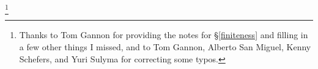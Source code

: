 \author{Arun Debray}
\date{\today}
\email{\MyEmail}
\thanks{Thanks to Tom Gannon for providing the notes for \S\ref{finiteness} and filling in a few other things I
missed, and to Tom Gannon, Alberto San Miguel, Kenny Schefers, and Yuri Sulyma for correcting some typos.}


\usepackage{afterpage}
\usepackage{tikz}
\usetikzlibrary{hobby}
\usepackage{lmodern}
\usepackage[T1]{fontenc}
\theoremstyle{theorem}
\newtheorem{conj}[equation]{Conjecture}
\theoremstyle{definition}
\newtheorem{quotdefn}[equation]{``Definition''}


\newcommand{\sX}{\mathscr X}
\newcommand{\sK}{\mathscr K}
\newcommand{\sN}{\mathscr N}
\newcommand{\sA}{\mathscr A}
\newcommand{\sB}{\mathscr B}
\newcommand{\scC}{\mathscr C}
\newcommand{\sC}{\mathsf C}
\newcommand{\M}{\mathcal M}
\DeclareMathOperator{\mult}{mult}
\newcommand{\PSU}{\mathrm{PSU}}
\DeclareMathOperator{\stab}{stab}
\DeclareMathOperator{\mon}{mon}
\DeclareMathOperator{\Div}{Div}
\DeclareMathOperator{\PDiv}{PDiv}
\DeclareMathOperator{\Cl}{C\ell}
\DeclareMathOperator{\Pic}{Pic}
\DeclareMathOperator{\Jac}{Jac}
\newcommand{\AJ}{\mathrm{AJ}}
\DeclareMathOperator{\ev}{ev}
\newcommand{\MCG}{\mathrm{MCG}}
\newcommand{\pr}{\mathrm{pr}}
\newcommand{\HP}{\mathbb{HP}}
\newcommand{\FRM}{\mathit{fr}}
\newcommand{\PT}{\mathit{PT}}
\newcommand{\cH}{\mathcal H}
\newcommand{\cE}{\mathcal E}
\DeclareMathOperator{\Conf}{Conf}
\newcommand{\cC}{\mathcal C}
\newcommand{\cI}{\mathcal I}
\newcommand{\cS}{\mathcal S}
\newcommand{\cD}{\mathcal D}
\newcommand{\gr}{\mathrm{gr}}
\newcommand{\SEnd}{\mathrm{SEnd}}
\DeclareMathOperator{\cl}{cl}
\DeclareMathOperator{\Ad}{Ad}
\DeclareMathOperator{\Der}{Der}
\newcommand{\spin}{\mathfrak{spin}}
\newcommand{\fs}{\mathfrak s}
\newcommand{\tnabla}{\widetilde\nabla}
\newcommand{\cB}{\mathcal B}
\newcommand{\cF}{\mathcal F}
\newcommand{\ch}{\mathit{ch}}
\newcommand{\scal}{\mathrm{scal}}
\newcommand{\vol}{\mathrm{vol}}
\newcommand{\fc}{\mathfrak c}
\newcommand{\Cirr}{C^{\mathrm{irr}}}
\newcommand{\Cred}{C^{\mathrm{red}}}
\newcommand{\cW}{\mathcal W}
\newcommand{\Mirr}{\widetilde M_\eta^{\mathrm{irr}}}
\DeclareMathOperator{\Det}{Det}
\newcommand{\sw}{\mathit{sw}}
\newcommand{\cV}{\mathcal V}
\DeclareMathOperator{\Fred}{Fred}
\newcommand{\scan}{\fs_{\mathrm{can}}}
\newcommand{\can}{_{\mathrm{can}}}
\newcommand{\sE}{\mathscr E}
